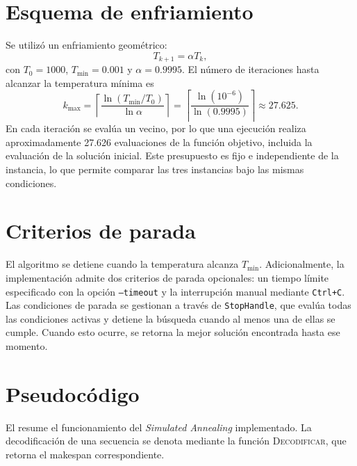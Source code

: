 \section{Esquema de enfriamiento}

Se utilizó un enfriamiento geométrico:
\[
    T_{k+1} = \alpha T_k,
\]
con \(T_0 = 1000\), \(T_{\min}=0.001\) y \(\alpha=0.9995\).
El número de iteraciones hasta alcanzar la temperatura mínima es
\[
    k_{\max} = \left\lceil \frac{\ln(T_{\min}/T_0)}{\ln \alpha} \right\rceil
    = \left\lceil \frac{\ln(10^{-6})}{\ln(0.9995)} \right\rceil
    \approx 27.625.
\]
En cada iteración se evalúa un vecino,
por lo que una ejecución realiza aproximadamente 27.626 evaluaciones de la función objetivo,
incluida la evaluación de la solución inicial.
Este presupuesto es fijo e independiente de la instancia,
lo que permite comparar las tres instancias bajo las mismas condiciones.

\section{Criterios de parada}

El algoritmo se detiene cuando la temperatura alcanza \(T_{\min}\).
Adicionalmente, la implementación admite dos criterios de parada opcionales:
un tiempo límite especificado con la opción \texttt{--timeout} y la interrupción manual mediante \texttt{Ctrl+C}.
Las condiciones de parada se gestionan a través de \texttt{StopHandle},
que evalúa todas las condiciones activas y detiene la búsqueda cuando al menos una de ellas se cumple.
Cuando esto ocurre, se retorna la mejor solución encontrada hasta ese momento.

\section{Pseudocódigo}

El  resume el funcionamiento del \emph{Simulated Annealing} implementado.
La decodificación de una secuencia se denota mediante la función \textsc{Decodificar},
que retorna el makespan correspondiente.

